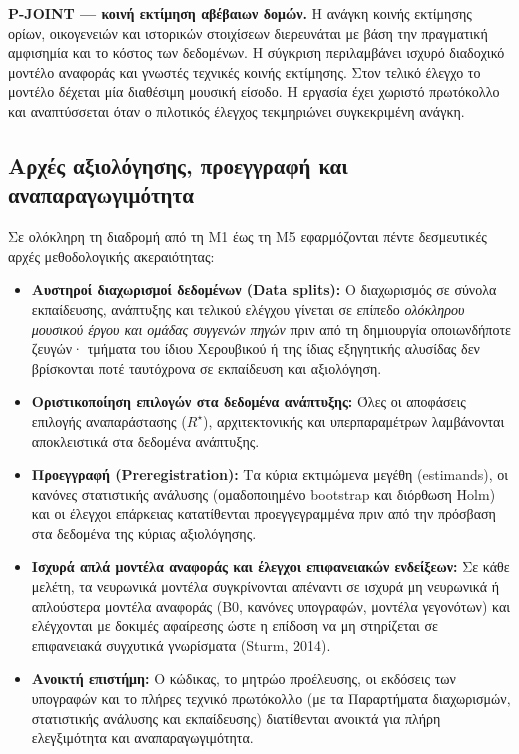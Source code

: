 \documentclass[11pt,a4paper]{article}
\begin{document}
\noindent\textbf{P-JOINT — κοινή εκτίμηση αβέβαιων δομών.} Η ανάγκη κοινής εκτίμησης ορίων, οικογενειών και ιστορικών στοιχίσεων διερευνάται με βάση την πραγματική αμφισημία και το κόστος των δεδομένων. Η σύγκριση περιλαμβάνει ισχυρό διαδοχικό μοντέλο αναφοράς και γνωστές τεχνικές κοινής εκτίμησης. Στον τελικό έλεγχο το μοντέλο δέχεται μία διαθέσιμη μουσική είσοδο. Η εργασία έχει χωριστό πρωτόκολλο και αναπτύσσεται όταν ο πιλοτικός έλεγχος τεκμηριώνει συγκεκριμένη ανάγκη.\par

\subsection{Αρχές αξιολόγησης, προεγγραφή και αναπαραγωγιμότητα}\label{ux3b1ux3c1ux3c7ux3adux3c2-ux3b1ux3beux3b9ux3bfux3bbux3ccux3b3ux3b7ux3c3ux3b7ux3c2-ux3c0ux3c1ux3bfux3b5ux3b3ux3b3ux3c1ux3b1ux3c6ux3ae-ux3baux3b1ux3b9-ux3b1ux3bdux3b1ux3c0ux3b1ux3c1ux3b1ux3b3ux3c9ux3b3ux3b9ux3bcux3ccux3c4ux3b7ux3c4ux3b1}

Σε ολόκληρη τη διαδρομή από τη Μ1 έως τη Μ5 εφαρμόζονται πέντε δεσμευτικές αρχές μεθοδολογικής ακεραιότητας:

\begin{itemize}
\item
  \textbf{Αυστηροί διαχωρισμοί δεδομένων (Data splits):} Ο διαχωρισμός σε σύνολα εκπαίδευσης, ανάπτυξης και τελικού ελέγχου γίνεται σε επίπεδο \emph{ολόκληρου μουσικού έργου και ομάδας συγγενών πηγών} πριν από τη δημιουργία οποιωνδήποτε ζευγών· τμήματα του ίδιου Χερουβικού ή της ίδιας εξηγητικής αλυσίδας δεν βρίσκονται ποτέ ταυτόχρονα σε εκπαίδευση και αξιολόγηση.
\item
  \textbf{Οριστικοποίηση επιλογών στα δεδομένα ανάπτυξης:} Όλες οι αποφάσεις επιλογής αναπαράστασης (\(R^\star\)), αρχιτεκτονικής και υπερπαραμέτρων λαμβάνονται αποκλειστικά στα δεδομένα ανάπτυξης.
\item
  \textbf{Προεγγραφή (Preregistration):} Τα κύρια εκτιμώμενα μεγέθη (estimands), οι κανόνες στατιστικής ανάλυσης (ομαδοποιημένο bootstrap και διόρθωση Holm) και οι έλεγχοι επάρκειας κατατίθενται προεγγεγραμμένα πριν από την πρόσβαση στα δεδομένα της κύριας αξιολόγησης.
\item
  \textbf{Ισχυρά απλά μοντέλα αναφοράς και έλεγχοι επιφανειακών ενδείξεων:} Σε κάθε μελέτη, τα νευρωνικά μοντέλα συγκρίνονται απέναντι σε ισχυρά μη νευρωνικά ή απλούστερα μοντέλα αναφοράς (B0, κανόνες υπογραφών, μοντέλα γεγονότων) και ελέγχονται με δοκιμές αφαίρεσης ώστε η επίδοση να μη στηρίζεται σε επιφανειακά συγχυτικά γνωρίσματα (Sturm, 2014).
\item
  \textbf{Ανοικτή επιστήμη:} Ο κώδικας, το μητρώο προέλευσης, οι εκδόσεις των υπογραφών και το πλήρες τεχνικό πρωτόκολλο (με τα Παραρτήματα διαχωρισμών, στατιστικής ανάλυσης και εκπαίδευσης) διατίθενται ανοικτά για πλήρη ελεγξιμότητα και αναπαραγωγιμότητα.
\end{itemize}
\end{document}
